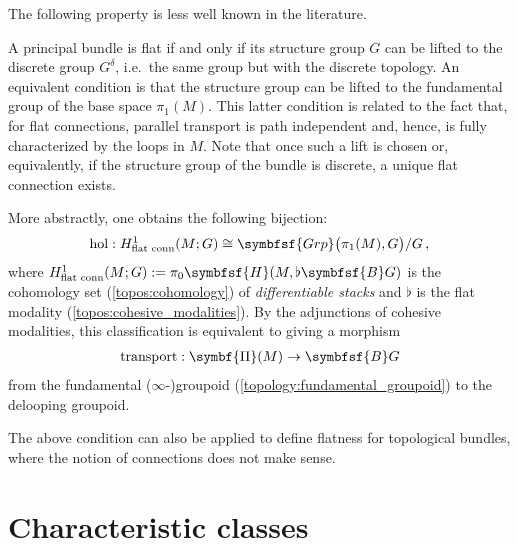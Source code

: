     The following property is less well known in the literature.
    \begin{property}\label{bundle:flat_connection_cohomology}
        A principal bundle is flat if and only if its structure group $G$ can be lifted to the discrete group $G^\delta$, i.e.~the same group but with the discrete topology. An equivalent condition is that the structure group can be lifted to the fundamental group of the base space $\pi_1(M)$. This latter condition is related to the fact that, for flat connections, parallel transport is path independent and, hence, is fully characterized by the loops in $M$. Note that once such a lift is chosen or, equivalently, if the structure group of the bundle is discrete, a unique flat connection exists.

        More abstractly, one obtains the following bijection:
        \begin{gather}
            \mathrm{hol}:H_{\text{flat conn}}^1(M;G)\cong\symbfsf{Grp}\bigl(\pi_1(M),G\bigr)/G\,,
        \end{gather}
        where $H_{\text{flat conn}}^1(M;G):=\pi_0\symbfsf{H}(M,\flat\symbfsf{B}G)$ is the cohomology set (\cref{topos:cohomology}) of \textit{differentiable stacks} and $\flat$ is the flat modality (\cref{topos:cohesive_modalities}). By the adjunctions of cohesive modalities, this classification is equivalent to giving a morphism
        \begin{gather}
            \mathrm{transport}:\symbf{\Pi}(M)\rightarrow\symbfsf{B}G
        \end{gather}
        from the fundamental ($\infty$-)groupoid (\cref{topology:fundamental_groupoid}) to the delooping groupoid.
    \end{property}
    \begin{remark}
        The above condition can also be applied to define flatness for topological bundles, where the notion of connections does not make sense.
    \end{remark}

\section{Characteristic classes}



